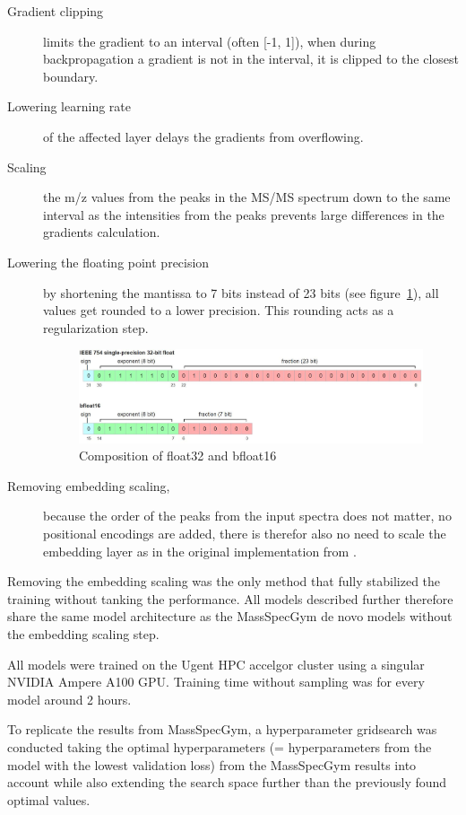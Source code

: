 \begin{description}
    \item[Gradient clipping]limits the gradient to an interval (often [-1, 1]),
    when during backpropagation a gradient is not in the interval,
    it is clipped to the closest boundary.
    \item[Lowering learning rate]of the affected layer delays the gradients from overflowing.
    \item[Scaling] the m/z values from the peaks in the \ac{MS/MS} spectrum down to the same interval as the intensities from the peaks prevents large differences in the gradients calculation.
    \item[Lowering the floating point precision]by shortening the mantissa to 7 bits instead of 23 bits (see figure~\ref{fig:bf16}), 
    all values get rounded to a lower precision. This rounding acts as a regularization step.
    \begin{figure}[h]
        \centering
        \includegraphics[width=\linewidth]{figures/methods/bf16.JPG}
        \caption{Composition of float32 and bfloat16}
        \label{fig:bf16}
    \end{figure}
    \item[Removing embedding scaling,]because the order of the peaks from the input spectra does not matter,
    no positional encodings are added, there is therefor also no need to scale the embedding layer as in the original implementation from \textcite{vaswani2017attention}.
\end{description}

Removing the embedding scaling was the only method that fully stabilized the training without tanking the performance.
All models described further therefore share the same model architecture as the MassSpecGym de novo models without the embedding scaling step.

All models were trained on the Ugent HPC accelgor cluster using a singular NVIDIA Ampere A100 GPU.
Training time without sampling was for every model around 2 hours. 

To replicate the results from MassSpecGym, a hyperparameter gridsearch was conducted taking the optimal hyperparameters (= hyperparameters from the model with the lowest validation loss) from the MassSpecGym results into account
while also extending the search space further than the previously found optimal values.

